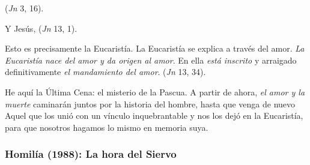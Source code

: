 \begin{body}
 (\textit{Jn} 3, 16). 

Y Jesús,  (\textit{Jn} 13, 1). 

Esto es precisamente la Eucaristía. La Eucaristía se explica a través del amor. \textit{La Eucaristía nace del amor y da origen al amor}. En ella \textit{está inscrito} y arraigado definitivamente \textit{el mandamiento del amor}.  (\textit{Jn} 13, 34).

He aquí la Última Cena: el misterio de la Pascua. A partir de ahora, \textit{el amor y la muerte} caminarán juntos por la historia del hombre, hasta que venga de nuevo Aquel que los unió con un vínculo inquebrantable y nos los dejó en la Eucaristía, para que nosotros hagamos lo mismo en memoria suya.
\end{body}

\label{b-05-01-1985H}
\newpage

\subsubsection{Homilía (1988): La hora del Siervo} 


